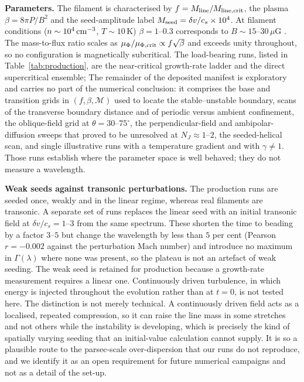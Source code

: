 \documentclass[usenatbib,twoside,twocolumn]{mnras}
\begin{document}
\smallskip\noindent\textbf{Parameters.} The filament is characterised by $f=M_{\rm line}/M_{\rm line,crit}$, the plasma $\beta=8\pi P/B^2$ and the seed-amplitude label $M_{\rm seed}=\delta v/c_s\times10^{4}$. At filament conditions ($n\sim10^4\,{\rm cm^{-3}}$, $T\sim10$\,K) $\beta=1$--$0.3$ corresponds to $B\sim15$--$30\,\mu$G \citep{Crutcher2012}. The mass-to-flux ratio scales as $\mu_\Phi/\mu_{\Phi,\rm crit}\propto f\sqrt{\beta}$ and exceeds unity throughout, so no configuration is magnetically subcritical. The load-bearing runs, listed in Table~\ref{tab:production}, are the near-critical growth-rate ladder and the direct supercritical ensemble; The remainder of the deposited manifest is exploratory and carries no part of the numerical conclusion: it comprises the base and transition grids in $(f,\beta,\mathcal{M})$ used to locate the stable--unstable boundary, scans of the transverse boundary distance and of periodic versus ambient confinement, the oblique-field grid at $\theta=30$--$75^\circ$, the perpendicular-field and ambipolar-diffusion sweeps that proved to be unresolved at $N_J\approx1$--$2$, the seeded-helical scan, and single illustrative runs with a temperature gradient and with $\gamma\neq1$. Those runs establish where the parameter space is well behaved; they do not measure a wavelength.

\smallskip\noindent\textbf{Weak seeds against transonic perturbations.} The production runs are seeded once, weakly and in the linear regime, whereas real filaments are transonic. A separate set of runs replaces the linear seed with an initial transonic field at $\delta v/c_s=1$--$3$ from the same spectrum. These shorten the time to beading by a factor $3$--$5$ but change the wavelength by less than $5$ per cent (Pearson $r=-0.002$ against the perturbation Mach number) and introduce no maximum in $\Gamma(\lambda)$ where none was present, so the plateau is not an artefact of weak seeding. The weak seed is retained for production because a growth-rate measurement requires a linear one. Continuously driven turbulence, in which energy is injected throughout the evolution rather than at $t=0$, is not tested here. The distinction is not merely technical. A continuously driven field acts as a localised, repeated compression, so it can raise the line mass in some stretches and not others while the instability is developing, which is precisely the kind of spatially varying seeding that an initial-value calculation cannot supply. It is so a plausible route to the parsec-scale over-dispersion that our runs do not reproduce, and we identify it as an open requirement for future numerical campaigns and not as a detail of the set-up.
\end{document}

